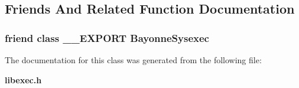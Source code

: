 \subsection{Friends And Related Function Documentation}
\subsubsection[{BayonneSysexec}]{\setlength{\rightskip}{0pt plus 5cm}friend class \_\-\_\-EXPORT {\bf BayonneSysexec}\hspace{0.3cm}{\ttfamily  [friend]}}\label{classost_1_1_bayonne_t_session_a41e3d94ac56bad5a96e61d578f825be2}


The documentation for this class was generated from the following file:\begin{DoxyCompactItemize}
\item 
{\bf libexec.h}\end{DoxyCompactItemize}
